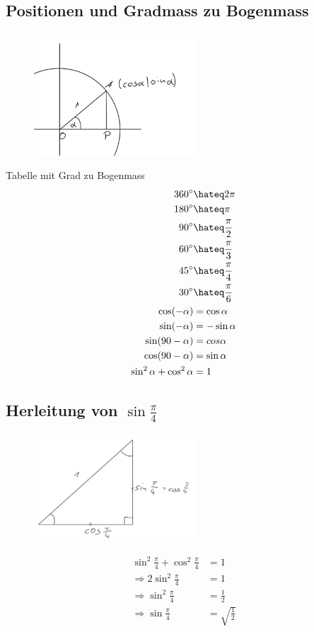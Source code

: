 \documentclass[a4paper,onecolumn,pdftex]{report}
\begin{document}
    \subsection*{Positionen und Gradmass zu Bogenmass}
    \begin{figure}
        \includegraphics[width=6cm]{2023-10-10_21h42_30.png}
    \end{figure}
    Tabelle mit Grad zu Bogenmass
    \begin{align*}
        360^\circ &\hateq 2\pi \\
        180^\circ &\hateq \pi \\
        90^\circ &\hateq \frac{\pi}{2} \\
        60^\circ &\hateq \frac{\pi}{3} \\
        45^\circ &\hateq \frac{\pi}{4} \\
        30^\circ &\hateq \frac{\pi}{6} \\
        \cos(-\alpha) &= \cos\alpha \\
        \sin(-\alpha) &= -\sin\alpha \\
        \sin(90-\alpha) &= cos\alpha \\
        \cos(90-\alpha) &= \sin\alpha \\
        \sin^2\alpha + \cos^2\alpha &= 1
    \end{align*}
    \newpage
    \subsection*{Herleitung von $\sin\frac{\pi}{4}$}
    \begin{figure}
        \includegraphics[width=6cm]{2023-10-11_23h34_34.png}
    \end{figure}
    \begin{align*}
        \sin^2\frac{\pi}{4}+\cos^2\frac{\pi}{4}&=1 \\
        \Rightarrow 2\sin^2\frac{\pi}{4}&=1 \\
        \Rightarrow \sin^2\frac{\pi}{4}&=\frac{1}{2} \\
        \Rightarrow \sin\frac{\pi}{4}&= \sqrt{\frac{1}{2}}
    \end{align*}
\end{document}

